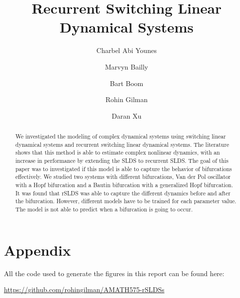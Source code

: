 \documentclass{amsart}
\title{Recurrent Switching Linear Dynamical Systems}
\author{Charbel Abi Younes \and Marvyn Bailly \and Bart Boom \and Rohin Gilman \and Daran Xu}
\date{}
\begin{document}
\begin{abstract}
	We investigated the modeling of complex dynamical systems using switching linear dynamical systems and recurrent switching linear dynamical systems. The literature shows that this method is able to estimate complex nonlinear dynamics, with an increase in performance by extending the SLDS to recurrent SLDS. The goal of this paper was to investigated if this model is able to capture the behavior of bifurcations effectively. We studied two systems with different bifurcations, Van der Pol oscillator with a Hopf bifurcation and a Bautin bifurcation with a generalized Hopf bifurcation. It was found that rSLDS was able to capture the different dynamics before and after the bifurcation. However, different models have to be trained for each parameter value. The model is not able to predict when a bifurcation is going to occur. 
\end{abstract}

\maketitle









\nocite{linderman_bayesian_2017, zoltowski_unifying_2020, chen_estimating_2015, blei_variational_2017, linderman_dependent_2015}


\section{Appendix}

All the code used to generate the figures in this report can be found here: 

\href{https://github.com/rohingilman/AMATH575-rSLDSs}{https://github.com/rohingilman/AMATH575-rSLDSs}


\end{document}
